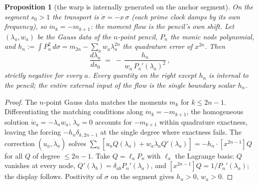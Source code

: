 \documentclass[11pt]{article}
\theoremstyle{plain}
\newtheorem{proposition}[theorem]{Proposition}
\theoremstyle{definition}
\theoremstyle{remark}
\begin{document}
\begin{proposition}[the warp is internally generated on the anchor segment]\label{prop:selfcal}
On the segment $s_0>1$ the transport is $\dot\sigma=-x\,\sigma$ (each prime clock damps
by its own frequency), so $\dot m_k=-m_{k+1}$: the moment flow is the pencil's own
shift. Let $(\lambda_a,w_a)$ be the Gauss data of the $n$-point pencil, $P_n$ the monic
node polynomial, and $h_n:=\int P_n^2\,d\sigma=m_{2n}-\sum_aw_a\lambda_a^{2n}$ the
quadrature error of $x^{2n}$. Then
\[
  \frac{d\lambda_a}{ds_0}\;=\;-\,\frac{h_n}{w_a\,P_n'(\lambda_a)^2}\,,
\]
strictly negative for every $a$. Every quantity on the right except $h_n$ is internal
to the pencil; the entire external input of the flow is the single boundary scalar
$h_n$.
\end{proposition}

\begin{proof}
The $n$-point Gauss data matches the moments $m_k$ for $k\le2n-1$. Differentiating the
matching conditions along $\dot m_k=-m_{k+1}$, the homogeneous solution
$\dot w_a=-\lambda_aw_a$, $\dot\lambda_a=0$ accounts for $-m_{k+1}$ within quadrature
exactness, leaving the forcing $-h_n\delta_{k,2n-1}$ at the single degree where
exactness fails. The correction $(u_a,\dot\lambda_a)$ solves
$\sum_a[u_aQ(\lambda_a)+w_a\dot\lambda_aQ'(\lambda_a)]=-h_n\cdot[x^{2n-1}]Q$ for all
$Q$ of degree $\le2n-1$. Take $Q=\ell_aP_n$ with $\ell_a$ the Lagrange basis: $Q$
vanishes at every node, $Q'(\lambda_b)=\delta_{ab}P_n'(\lambda_a)$, and
$[x^{2n-1}]Q=1/P_n'(\lambda_a)$; the display follows. Positivity of $\sigma$ on the
segment gives $h_n>0$, $w_a>0$.
\end{proof}
\end{document}
